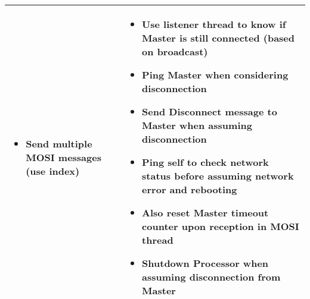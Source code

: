 \documentclass{article}
\begin{document}
\begin{center}
\begin{longtable}{| p{} | p{} |}
\begin{itemize}
		\item Send multiple MOSI messages (use index)
	\end{itemize}
	&
	\begin{itemize}
		\item Use listener thread to know if Master is still connected (based on
			broadcast)
		\item Ping Master when considering disconnection
		\item Send Disconnect message to Master when assuming disconnection
		\item Ping self to check network status before assuming network error and 
			rebooting
		\item Also reset Master timeout counter upon reception in MOSI thread
		\item Shutdown Processor when assuming disconnection from Master
	\end{itemize}
	\\
	\hline

\end{longtable}
\end{center}

\pagebreak
\end{document}
